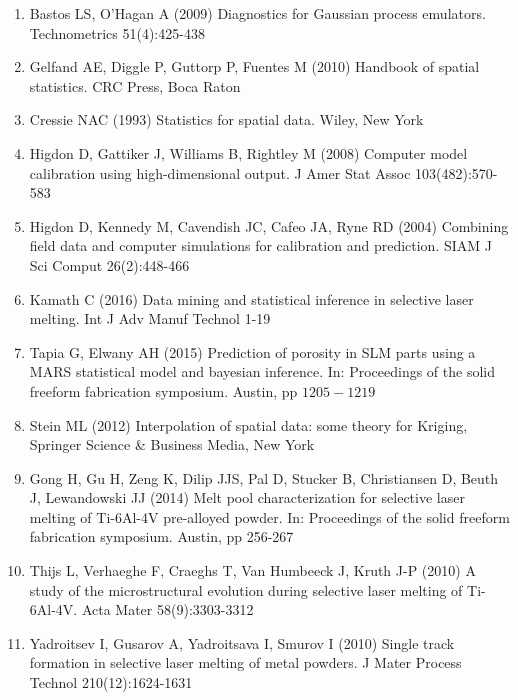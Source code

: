 \documentclass[10pt]{article}
\begin{document}
\begin{enumerate}
  \item Bastos LS, O'Hagan A (2009) Diagnostics for Gaussian process emulators. Technometrics 51(4):425-438

  \item Gelfand AE, Diggle P, Guttorp P, Fuentes M (2010) Handbook of spatial statistics. CRC Press, Boca Raton

  \item Cressie NAC (1993) Statistics for spatial data. Wiley, New York

  \item Higdon D, Gattiker J, Williams B, Rightley M (2008) Computer model calibration using high-dimensional output. J Amer Stat Assoc 103(482):570-583

  \item Higdon D, Kennedy M, Cavendish JC, Cafeo JA, Ryne RD (2004) Combining field data and computer simulations for calibration and prediction. SIAM J Sci Comput 26(2):448-466

  \item Kamath C (2016) Data mining and statistical inference in selective laser melting. Int J Adv Manuf Technol 1-19

  \item Tapia G, Elwany AH (2015) Prediction of porosity in SLM parts using a MARS statistical model and bayesian inference. In: Proceedings of the solid freeform fabrication symposium. Austin, pp $1205-1219$

  \item Stein ML (2012) Interpolation of spatial data: some theory for Kriging, Springer Science \& Business Media, New York

  \item Gong H, Gu H, Zeng K, Dilip JJS, Pal D, Stucker B, Christiansen D, Beuth J, Lewandowski JJ (2014) Melt pool characterization for selective laser melting of Ti-6Al-4V pre-alloyed powder. In: Proceedings of the solid freeform fabrication symposium. Austin, pp 256-267

  \item Thijs L, Verhaeghe F, Craeghs T, Van Humbeeck J, Kruth J-P (2010) A study of the microstructural evolution during selective laser melting of Ti-6Al-4V. Acta Mater 58(9):3303-3312

  \item Yadroitsev I, Gusarov A, Yadroitsava I, Smurov I (2010) Single track formation in selective laser melting of metal powders. J Mater Process Technol 210(12):1624-1631


\end{enumerate}
\end{document}
